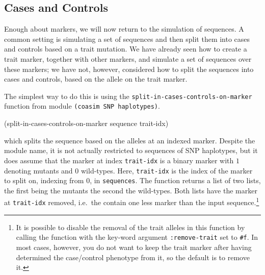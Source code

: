 \documentclass{manual}
\begin{document}
\subsection{Cases and Controls}
\label{sec:cases-controls}

Enough about markers, we will now return to the simulation of
sequences.  A common setting is simulating a set of sequences and then
split them into cases and controls based on a trait mutation.  We have
already seen how to create a trait marker, together with other
markers, and simulate a set of sequences over these markers; we have
not, however, considered how to split the sequences into cases and
controls, based on the allele on the trait marker.

The simplest way to do this is using the
\texttt{split-in-cases-controls-on-marker} function from module \texttt{(coasim
  SNP haplotypes)}.
\begin{code}
(split-in-cases-controls-on-marker sequence trait-idx)
\end{code}
which splits the sequence based on the alleles at an indexed marker.
Despite the module name, it is not actually restricted to sequences of
SNP haplotypes, but it does assume that the marker at index
\texttt{trait-idx} is a binary marker with $1$ denoting mutants and
$0$ wild-types.  Here, \texttt{trait-idx} is the index of the marker
to split on, indexing from $0$, in \texttt{sequences}.  The function
returns a list of two lists, the first being the mutants the second
the wild-types.  Both lists have the marker at \texttt{trait-idx}
removed, i.e.\ the contain one less marker than the input
sequence.\footnote{
  It is possible to disable the removal of the trait alleles in this
  function by calling the function with the key-word argument
  \texttt{:remove-trait} set to \texttt{\#f}.  In most cases, however,
  you do not want to keep the trait marker after having determined the
  case/control phenotype from it, so the default is to remove it.
  }
\end{document}
